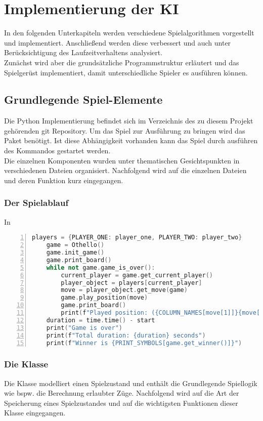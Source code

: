 \chapter{Implementierung der KI}
In den folgenden Unterkapiteln  werden verschiedene Spielalgorithmen vorgestellt und implementiert. Anschließend werden diese verbessert und auch unter Berücksichtigung des Laufzeitverhaltens analysiert.
\\Zunächst wird aber die grundsätzliche Programmstruktur erläutert und das Spielgerüst implementiert, damit unterschiedliche Spieler es ausführen können.
\section{Grundlegende Spiel-Elemente}
Die Python Implementierung befindet sich im Verzeichnis  des zu diesem Projekt gehörenden git Repository. Um das Spiel zur Ausführung zu bringen wird das Paket  benötigt. Ist diese Abhängigkeit vorhanden kann das Spiel durch ausführen des Kommandos  gestartet werden.
\\Die einzelnen Komponenten wurden unter thematischen Gesichtspunkten in verschiedenen Dateien organisiert. Nachfolgend wird auf die einzelnen Dateien und deren Funktion kurz eingegangen.
\subsection{Der Spielablauf}
In 
\begin{lstlisting}[caption = {Spielablauf in \mxZitat{main-game.py}}, language = cpp, captionpos = t , numbers=left, label={lst:lst-main-game}]
    players = {PLAYER_ONE: player_one, PLAYER_TWO: player_two}
    game = Othello()
    game.init_game()
    game.print_board()
    while not game.game_is_over():
        current_player = game.get_current_player()
        player_object = players[current_player]
        move = player_object.get_move(game)
        game.play_position(move)
        game.print_board()
        print(f"Played position: ({COLUMN_NAMES[move[1]]}{move[0] + 1})")
    duration = time.time() - start
    print("Game is over")
    print(f"Total duration: {duration} seconds")
    print(f"Winner is {PRINT_SYMBOLS[game.get_winner()]}")
\end{lstlisting}
\subsection{Die Klasse }
Die Klasse  modelliert einen Spielzustand und enthält die Grundlegende Spiellogik wie bspw. die Berechnung erlaubter Züge. Nachfolgend wird auf die Art der Speicherung eines Spielzustandes und auf die wichtigsten Funktionen dieser Klasse eingegangen.
